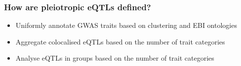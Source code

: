 \documentclass{beamer}
\newcommand*{\floatRelativePath}{../out/gwas417/pval_5e-08/r2_0.1/kb_1000/window_1000000/75_50}%
\begin{document}
%
%

    \begin{frame}
        \frametitle{How are pleiotropic eQTLs defined?}

        \begin{itemize}
            \item Uniformly annotate GWAS traits based on clustering and EBI ontologies
            \item Aggregate colocalised eQTLs based on the number of trait categories
            \item Analyse eQTLs in groups based on the number of trait categories
        \end{itemize}

    \end{frame}
\end{document}
